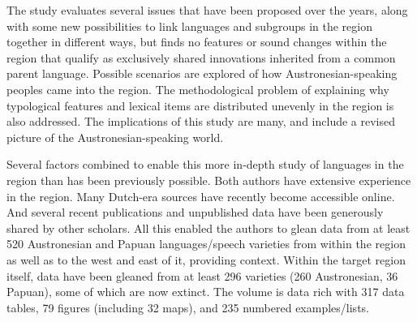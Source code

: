 The study evaluates several issues that have been proposed over the years,
along with some new possibilities to link languages
and subgroups in the region together in different ways,
but finds no features or sound changes within the region that qualify as exclusively
shared innovations inherited from a common parent language.
Possible scenarios are explored of how Austronesian-speaking peoples came into the region.
The methodological problem of explaining why typological features
and lexical items are distributed unevenly in the region is also addressed.
The implications of this study are many,
and include a revised picture of the Austronesian-speaking world.

Several factors combined to enable this more in-depth study
of languages in the region than has been previously possible.
Both authors have extensive experience in the region.
Many Dutch-era sources have recently become accessible online.
And several recent publications
and unpublished data have been generously shared by other scholars.
All this enabled the authors to glean data from at least 520 Austronesian
and Papuan languages/speech varieties from within the region as well as to the west
and east of it,
providing context.
Within the target region itself,
data have been gleaned from at least 296 varieties (260 Austronesian, 36 Papuan),
some of which are now extinct.
The volume is data rich with 317 data tables,
79 figures (including 32 maps),
and 235 numbered examples/lists.
 
 